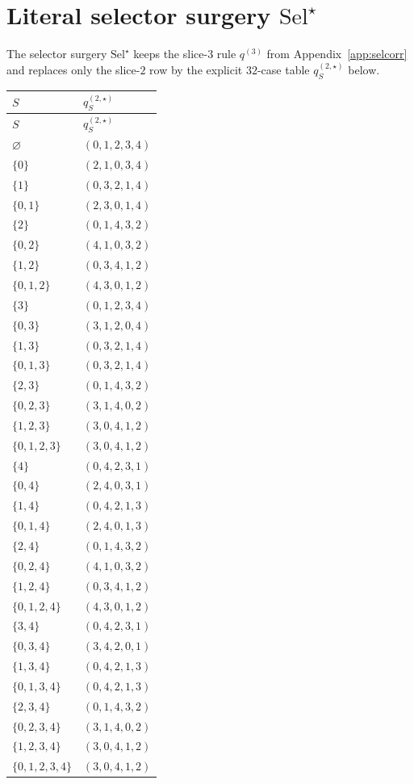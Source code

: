 \documentclass[11pt]{article}
\newcommand{\SelStar}{\mathrm{Sel}^{\star}}
\begin{document}
\section{Literal selector surgery \texorpdfstring{\(\SelStar\)}{SelStar}}
\label{app:selstar}

The selector surgery \(\SelStar\) keeps the slice-\(3\) rule \(q^{(3)}\) from
Appendix~\ref{app:selcorr} and replaces only the slice-\(2\) row by the
explicit \(32\)-case table \(q^{(2,\star)}_S\) below.

\begin{center}
\small
\begin{longtable}{@{}ll@{}}
\toprule
$S$ & $q^{(2,\star)}_S$ \\
\midrule
\endfirsthead
\toprule
$S$ & $q^{(2,\star)}_S$ \\
\midrule
\endhead
$\varnothing$ & $(0,1,2,3,4)$ \\
$\{0\}$ & $(2,1,0,3,4)$ \\
$\{1\}$ & $(0,3,2,1,4)$ \\
$\{0,1\}$ & $(2,3,0,1,4)$ \\
$\{2\}$ & $(0,1,4,3,2)$ \\
$\{0,2\}$ & $(4,1,0,3,2)$ \\
$\{1,2\}$ & $(0,3,4,1,2)$ \\
$\{0,1,2\}$ & $(4,3,0,1,2)$ \\
$\{3\}$ & $(0,1,2,3,4)$ \\
$\{0,3\}$ & $(3,1,2,0,4)$ \\
$\{1,3\}$ & $(0,3,2,1,4)$ \\
$\{0,1,3\}$ & $(0,3,2,1,4)$ \\
$\{2,3\}$ & $(0,1,4,3,2)$ \\
$\{0,2,3\}$ & $(3,1,4,0,2)$ \\
$\{1,2,3\}$ & $(3,0,4,1,2)$ \\
$\{0,1,2,3\}$ & $(3,0,4,1,2)$ \\
$\{4\}$ & $(0,4,2,3,1)$ \\
$\{0,4\}$ & $(2,4,0,3,1)$ \\
$\{1,4\}$ & $(0,4,2,1,3)$ \\
$\{0,1,4\}$ & $(2,4,0,1,3)$ \\
$\{2,4\}$ & $(0,1,4,3,2)$ \\
$\{0,2,4\}$ & $(4,1,0,3,2)$ \\
$\{1,2,4\}$ & $(0,3,4,1,2)$ \\
$\{0,1,2,4\}$ & $(4,3,0,1,2)$ \\
$\{3,4\}$ & $(0,4,2,3,1)$ \\
$\{0,3,4\}$ & $(3,4,2,0,1)$ \\
$\{1,3,4\}$ & $(0,4,2,1,3)$ \\
$\{0,1,3,4\}$ & $(0,4,2,1,3)$ \\
$\{2,3,4\}$ & $(0,1,4,3,2)$ \\
$\{0,2,3,4\}$ & $(3,1,4,0,2)$ \\
$\{1,2,3,4\}$ & $(3,0,4,1,2)$ \\
$\{0,1,2,3,4\}$ & $(3,0,4,1,2)$ \\
\bottomrule
\end{longtable}
\end{center}
\end{document}
